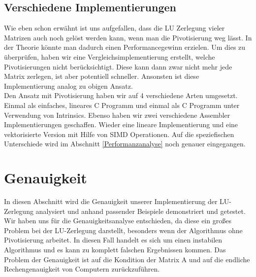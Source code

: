 \documentclass[course=erap]{aspdoc}
\begin{document}
\subsection{Verschiedene Implementierungen}
Wie eben schon erwähnt ist uns aufgefallen, dass die LU Zerlegung vieler Matrizen auch noch gelöst werden kann, wenn man 
die Pivotisierung weg lässt. In der Theorie könnte man dadurch einen Performancegewinn erzielen. Um dies zu überprüfen, 
haben wir eine Vergleichsimplementierung erstellt, welche Pivotisierungen nicht berücksichtigt. Diese kann dann zwar nicht 
mehr jede Matrix zerlegen, ist aber potentiell schneller. Ansonsten ist diese Implementierung analog zu obigen Ansatz.\\ 
Den Ansatz mit Pivotisierung haben wir auf 4 verschiedene Arten umgesetzt. Einmal als einfaches, lineares C Programm 
und einmal als C Programm unter Verwendung von Intrinsics. Ebenso haben wir zwei verschiedene Assembler Implementierungen 
geschaffen. Wieder eine lineare Implementierung und eine vektorisierte Version mit Hilfe von SIMD Operationen.
Auf die speziefischen Unterschiede wird im Abschnitt \ref{Performanzanalyse} noch genauer eingegangen.




\section{Genauigkeit}
In diesen Abschnitt wird die Genauigkeit unserer Implementierung der LU-Zerlegung analysiert und anhand 
passender Beispiele demonstriert und getestet. Wir haben uns für die 
Genauigkeitsanalyse entschieden, da diese ein großes Problem bei der LU-Zerlegung 
darstellt, besonders wenn der Algorithmus ohne Pivotisierung arbeitet. In diesen Fall 
handelt es sich um einen instabilen Algorithmus und es kann zu komplett 
falschen Ergebnissen kommen. Das Problem der Genauigkeit ist auf die Kondition der 
Matrix A und auf die endliche Rechengenauigkeit von Computern zurückzuführen\cite[62, 63]{M2017}. \\
\end{document}
